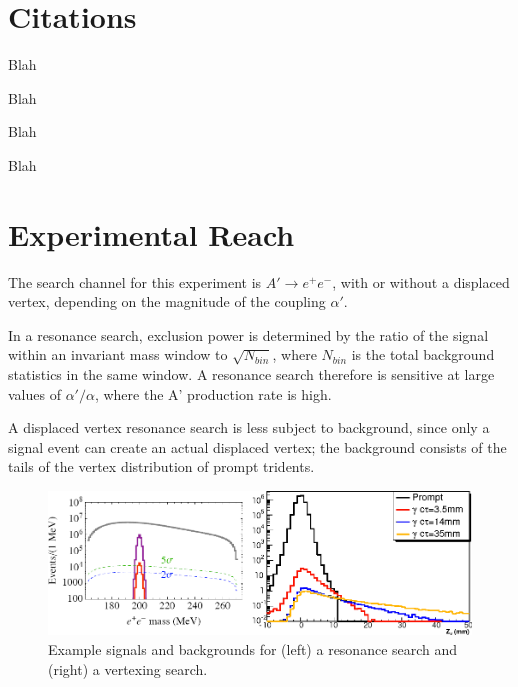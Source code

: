 \documentclass[b1]{sciposter}
\begin{document}
\begin{multicols}{3}
\section{Citations}
	Blah
	
	Blah
	
	Blah 
	
	Blah
        \columnbreak
	\section*{Experimental Reach}
	The search channel for this experiment is $A'\to e^+e^-$, with or without a displaced vertex, depending on the magnitude of the coupling $\alpha'$.

	In a resonance search, exclusion power is determined by the ratio of the signal within an invariant mass window to $\sqrt{N_{bin}}$, where $N_{bin}$ is the total background statistics in the same window. A resonance search therefore is sensitive at large values of $\alpha'/\alpha$, where the A' production rate is high.

	A displaced vertex resonance search is less subject to background, since only a signal event can create an actual displaced vertex; the background consists of the tails of the vertex distribution of prompt tridents.
	\begin{figure}
		\begin{center}
			\includegraphics[width=\textwidth]{s_b}
		\end{center}
		\caption{Example signals and backgrounds for (left) a resonance search and (right) a vertexing search.}
	\end{figure}


\end{multicols}
\end{document}
